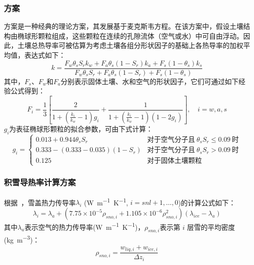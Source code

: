 \subsubsection{\citet{de1963thermal}方案}
\citet{de1963thermal}方案是一种经典的理论方案，其发展基于麦克斯韦方程。在该方案中，假设土壤结构由椭球形颗粒组成，这些颗粒在连续的孔隙流体（空气或水）中可自由浮动。因此，土壤总热导率可被估算为考虑土壤各组分形状因子的基础上各热导率的加权平均值，表达式如下：$$k=\frac{F_w\theta_sS_rk_w+F_a\theta_s\left(1-S_r\right)k_a+F_s\left(1-\theta_s\right)k_s}{F_w\theta_sS_r+F_a\theta_s\left(1-S_r\right)+F_s\left(1-\theta_s\right)}$$
其中，$F_s$、$F_w$和$F_a$分别表示固体土壤、水和空气的形状因子，它们可通过如下经验公式得到：
\begin{equation}
F_i=\frac{1}{3}\left[\frac{2}{1+\left(\frac{k_i}{k_w}-1\right)g_i}+\frac{1}{1+\left(\frac{k_i}{k_w}-1\right)(1-2g_i)}\right],\quad i=w,a,s
\end{equation}
$g_i$为表征椭球形颗粒的拟合参数，可由下式计算：
\begin{equation}
g_i=\begin{cases}
0.013+0.944\theta_sS_r  & \text{对于空气分子且}\ \theta_sS_r\leqslant 0.09\ \text{时} \\ 
0.333-\left(0.333-0.035\right)\left(1-S_r\right) & \text{对于空气分子且}\ \theta_sS_r>0.09\ \text{时} \\
0.125 &\text{对于固体土壤颗粒}
\end{cases}
\end{equation}


\subsubsection{积雪导热率计算方案}
根据~\citet{jordan1991one}，雪盖热力传导率$\lambda_i$ (\unit{W.m^{-1}.K^{-1}}, $i=snl+1,\ldots,0$)的计算公式如下：
\begin{equation}
\lambda_{i}=\lambda_{a}+\left(7.75 \times 10^{-5} \rho_{sno, i}+1.105 \times 10^{-6} \rho_{sno, i}^{2}\right)\left(\lambda_{ice}-\lambda_{a}\right)
\end{equation}
其中$\lambda_a$表示空气的热力传导率(\unit{W.m^{-1}.K^{-1}})，$\rho_{sno,i}$表示第 $i$ 层雪的平均密度(\unit{kg.m^{-3}})：
\begin{equation}
\rho_{sno, i}=\frac{w_{liq, i}+w_{ice, i}}{\Delta z_{i}}
\end{equation}


